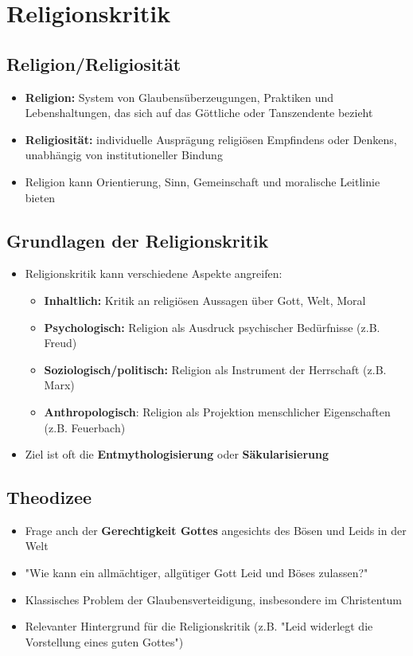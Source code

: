 
\section{Religionskritik}


\subsection{Religion/Religiosität}
\begin{itemize}
    \item \textbf{Religion:} System von Glaubensüberzeugungen, Praktiken und Lebenshaltungen, das sich auf das Göttliche oder Tanszendente bezieht
    \item \textbf{Religiosität:} individuelle Ausprägung religiösen Empfindens oder Denkens, unabhängig von institutioneller Bindung
    \item Religion kann Orientierung, Sinn, Gemeinschaft und moralische Leitlinie bieten
\end{itemize}


\subsection{Grundlagen der Religionskritik}
\begin{itemize}
    \item Religionskritik kann verschiedene Aspekte angreifen:
    \begin{itemize}
        \item \textbf{Inhaltlich:} Kritik an religiösen Aussagen über Gott, Welt, Moral
        \item \textbf{Psychologisch:} Religion als Ausdruck psychischer Bedürfnisse (z.B. Freud)
        \item \textbf{Soziologisch/politisch:} Religion als Instrument der Herrschaft (z.B. Marx)
        \item \textbf{Anthropologisch}: Religion als Projektion menschlicher Eigenschaften (z.B. Feuerbach)
    \end{itemize}
    \item Ziel ist oft die \textbf{Entmythologisierung} oder \textbf{Säkularisierung}
\end{itemize}

\subsection{Theodizee}
\begin{itemize}
    \item Frage anch der \textbf{Gerechtigkeit Gottes} angesichts des Bösen und Leids in der Welt
    \item "Wie kann ein allmächtiger, allgütiger Gott Leid und Böses zulassen?"
    \item Klassisches Problem der Glaubensverteidigung, insbesondere im Christentum
    \item Relevanter Hintergrund für die Religionskritik (z.B. "Leid widerlegt die Vorstellung eines guten Gottes")
\end{itemize}

